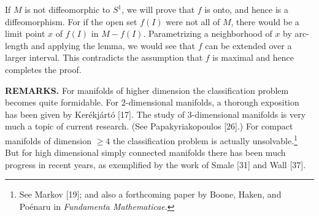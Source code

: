 If $M$ is not diffeomorphic to $S^1$, we will prove that $f$ is onto, and hence is a diffeomorphism. For if the open set $f(I)$ were not all of $M$, there would be a limit point $x$ of $f(I)$ in $M - f(I)$. Parametrizing a neighborhood of $x$ by arc-length and applying the lemma, we would see that $f$ can be extended over a larger interval. This contradicts the assumption that $f$ is maximal and hence completes the proof.

\noindent\textbf{REMARKS.} For manifolds of higher dimension the classification problem becomes quite formidable. For $2$-dimensional manifolds, a thorough exposition has been given by Ker\'ekj\'art\'o [17]. The study of $3$-dimensional manifolds is very much a topic of current research. (See Papakyriakopoulos [26].) For compact manifolds of dimension $\ge 4$ the classification problem is actually unsolvable.\footnote{See Markov [19]; and also a forthcoming paper by Boone, Haken, and Po\'enaru in \emph{Fundamenta Mathematicae}.} But for high dimensional simply connected manifolds there has been much progress in recent years, as exemplified by the work of Smale [31] and Wall [37].

